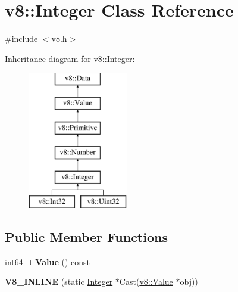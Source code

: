 \hypertarget{classv8_1_1_integer}{}\section{v8\+:\+:Integer Class Reference}
\label{classv8_1_1_integer}


{\ttfamily \#include $<$v8.\+h$>$}

Inheritance diagram for v8\+:\+:Integer\+:\begin{figure}[H]
\begin{center}
\leavevmode
\includegraphics[height=6.000000cm]{classv8_1_1_integer}
\end{center}
\end{figure}
\subsection*{Public Member Functions}
\begin{DoxyCompactItemize}
\item 
\hypertarget{classv8_1_1_integer_a93bcfb39090631a3ff95843463183c9c}{}int64\+\_\+t {\bfseries Value} () const \label{classv8_1_1_integer_a93bcfb39090631a3ff95843463183c9c}

\item 
\hypertarget{classv8_1_1_integer_aa652cacbe6f4a0772dff46e1f07d0daf}{}{\bfseries V8\+\_\+\+I\+N\+L\+I\+N\+E} (static \hyperlink{classv8_1_1_integer}{Integer} $\ast$Cast(\hyperlink{classv8_1_1_value}{v8\+::\+Value} $\ast$obj))\label{classv8_1_1_integer_aa652cacbe6f4a0772dff46e1f07d0daf}

\end{DoxyCompactItemize}
